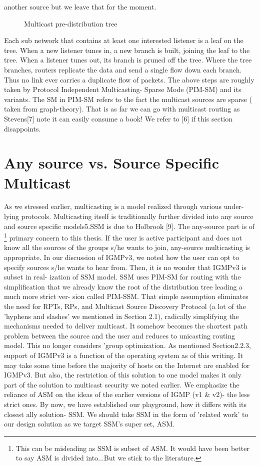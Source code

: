 \documentclass[11pt,left=2cm,bottom=2cm,oneside]{book}
\begin{document}
another
source but we leave that for the moment.\\
\begin{flushleft}\begin{figure}[H]\caption{Multicast pre-distribution tree}\end{figure}\end{flushleft}
Each sub network that contains at least one interested listener is a leaf on
the
tree. When a new listener tunes in, a new branch is built, joining the leaf to
the
tree. When a listener tunes out, its branch is pruned off the tree. Where the
tree
branches, routers replicate the data and send a single flow down each branch.
Thus
no link ever carries a duplicate flow of packets.
The above steps are roughly taken by Protocol Independent Multicasting-
Sparse Mode (PIM-SM) and its variants. The SM in PIM-SM refers to the fact the
multicast sources are sparse ( taken from graph-theory). That is as far we can
go
with multicast routing as Stevens[7] note it can easily consume a book! We
refer
to [6] if this section disappoints.
\section{Any source vs. Source Specific Multicast}
As we stressed earlier, multicasting is a model realized through various
under-
lying protocols. Multicasting itself is traditionally further divided into any
source
and source specific models5.SSM is due to Holbrook [9]. The any-source part is
of
\footnote{This can be misleading as SSM is subset of ASM. It would have been better to
say ASM is
divided into...But we stick to the literature.}
primary concern to this thesis.
If the user is active participant and does not know all the sources of the
groups
s/he wants to join, any-source multicasting is appropriate.
In our discussion of IGMPv3, we noted how the user can opt to specify sources
s/he wants to hear from. Then, it is no wonder that IGMPv3 is subset in real-
ization of SSM model. SSM uses PIM-SM for routing with the simplification that
we already know the root of the distribution tree leading a much more strict
ver-
sion called PIM-SSM. That simple assumption eliminates the need for RPTs, RPs,
and Multicast Source Discovery Protocol (a lot of the 'hyphens and slashes' we
mentioned in Section 2.1), radically simplifying the mechanisms needed to
deliver
multicast. It somehow becomes the shortest path problem between the source and
the user and reduces to unicasting routing model. This no longer considers
'group
optimization. As mentioned Section2.2.3, support of IGMPv3 is a function of
the
operating system as of this writing. It may take some time before the majority
of hosts on the Internet are enabled for IGMPv3. But also, the restriction of
this
solution to one model makes it only part of the solution to multicast security
we
noted earlier. We emphasize the reliance of ASM on the ideas of the earlier
versions
of IGMP (v1 \& v2)- the less strict ones.
By now, we have established our playground, how it differs with its closest
ally
solution- SSM. We should take SSM in the form of 'related work' to our design
solution as we target SSM's super set, ASM.
\end{document}
